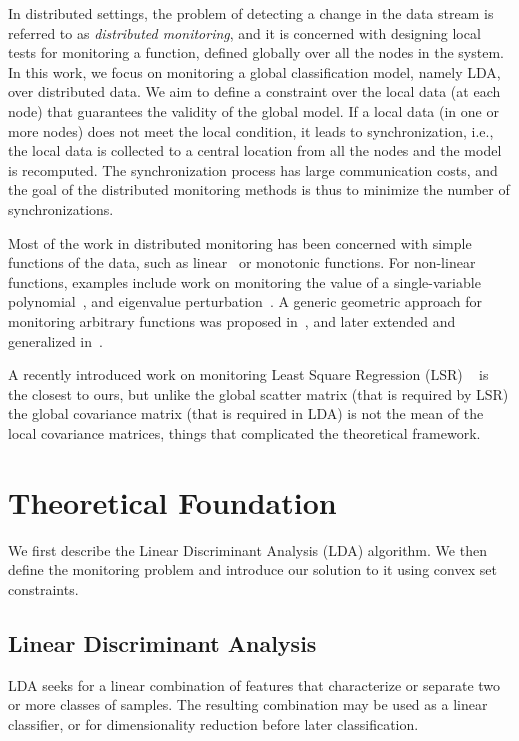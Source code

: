\documentclass{sig-alternate-05-2015}
\begin{document}
In distributed settings, the problem of detecting a change in the data stream is referred to as {\em distributed monitoring}, and it is concerned with designing local tests for monitoring a function, defined globally over all the nodes in the system.
In this work, we focus on monitoring a global classification model, namely LDA, over distributed data.
We aim to define a constraint over the local data (at each node) that guarantees the validity of the global model. If a local data (in one or more nodes) does not meet the local condition, it leads to synchronization, i.e., the local data is collected to a central location from all the nodes and the model is recomputed.
The synchronization process has large communication costs, and the goal of the distributed monitoring methods is thus to minimize the number of synchronizations.

Most of the work in distributed monitoring has been concerned with simple 
functions of the data, such as 
linear~\cite{keralapura2006communication, kashyap2008efficient} or 
monotonic \cite{michel2005klee} functions. 
For non-linear functions, examples include work on monitoring the value 
of a single-variable polynomial~\cite{shah2008handling}, 
and eigenvalue perturbation~\cite{huang2007communication}. 
A generic geometric approach for monitoring arbitrary functions was proposed 
in~\cite{sharfman2007geometric}, and later extended and generalized 
in~\cite{keren2012shape,lazerson2015monitoring}.

A recently introduced work on monitoring Least Square 
Regression (LSR) ~\cite{gabel2015monitoring} is the closest to ours, 
but unlike the global scatter matrix (that is required by LSR) the global
covariance matrix (that is required in LDA) is not the mean of the 
local covariance matrices, things that complicated the theoretical framework. 


\section{Theoretical Foundation}
We first describe the Linear Discriminant Analysis (LDA) algorithm. 
We then define the monitoring problem and introduce our solution to it 
using convex set constraints.

\subsection{Linear Discriminant Analysis}%
LDA seeks for a linear combination of features that characterize or separate two or more classes of samples.
The resulting combination may be used as a linear classifier, or for dimensionality reduction before later classification.
\end{document}
